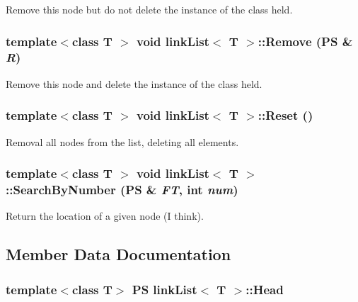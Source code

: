 Remove this node but do not delete the instance of the class held. \hypertarget{classlink_list_a037a6302399829af84930668eedd6f71}{
\subsubsection[{Remove}]{\setlength{\rightskip}{0pt plus 5cm}template$<$class T $>$ void {\bf linkList}$<$ T $>$::Remove ({\bf PS} \& {\em R})}}
\label{classlink_list_a037a6302399829af84930668eedd6f71}


Remove this node and delete the instance of the class held. \hypertarget{classlink_list_a4cfd6a668f25493621d5c2e9db192359}{
\subsubsection[{Reset}]{\setlength{\rightskip}{0pt plus 5cm}template$<$class T $>$ void {\bf linkList}$<$ T $>$::Reset ()}}
\label{classlink_list_a4cfd6a668f25493621d5c2e9db192359}


Removal all nodes from the list, deleting all elements. \hypertarget{classlink_list_aa954023a6cb312bec80507a3191cc367}{
\subsubsection[{SearchByNumber}]{\setlength{\rightskip}{0pt plus 5cm}template$<$class T $>$ void {\bf linkList}$<$ T $>$::SearchByNumber ({\bf PS} \& {\em FT}, \/  int {\em num})}}
\label{classlink_list_aa954023a6cb312bec80507a3191cc367}


Return the location of a given node (I think). 

\subsection{Member Data Documentation}
\hypertarget{classlink_list_a9a8d0e93011c492561e5bba4ae95499c}{
\subsubsection[{Head}]{\setlength{\rightskip}{0pt plus 5cm}template$<$class T$>$ {\bf PS} {\bf linkList}$<$ T $>$::{\bf Head}}}
\label{classlink_list_a9a8d0e93011c492561e5bba4ae95499c}



